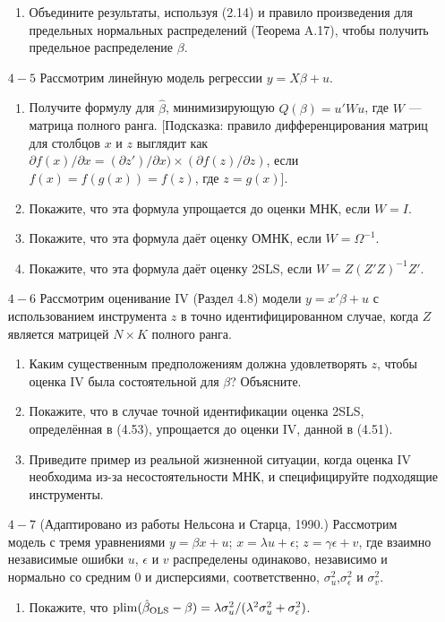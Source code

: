 \begin{small}
\begin{enumerate}
\begin{enumerate}
\item Объедините результаты, используя (2.14) и правило произведения для предельных нормальных распределений (Теорема A.17), чтобы получить предельное распределение $\beta$. 
\end{enumerate}
\item [$4-5$] Рассмотрим линейную модель регрессии $y = X\beta +u$.
\begin{enumerate}
\item Получите формулу для $\hat{\beta}$, минимизирующую $Q(\beta) = u'Wu$, где $W$ --- матрица полного ранга. [Подсказка:  правило дифференцирования матриц для столбцов $x$ и $z$ выглядит как $\partial f(x)/\partial x = (\partial z')/\partial x) \times (\partial f(z)/\partial z)$, если $f(x) = f(g(x)) = f(z)$, где $z = g(x)$].
\item Покажите, что эта формула упрощается до оценки МНК, если $W=I$.
\item Покажите, что эта формула даёт оценку ОМНК, если $W= \Omega^{-1}$.
\item Покажите, что эта формула даёт оценку 2SLS, если $W= Z(Z'Z)^{-1}Z'$.
\end{enumerate}
\item [$4-6$] Рассмотрим оценивание IV (Раздел 4.8) модели $y = x'\beta +u$ с использованием инструмента $z$ в точно идентифицированном случае, когда $Z$ является матрицей $N \times K$ полного ранга.
\begin{enumerate}
\item Каким существенным предположениям должна удовлетворять $z$, чтобы оценка IV была состоятельной для $\beta$? Объясните.
\item Покажите, что в случае точной идентификации оценка 2SLS, определённая в (4.53), упрощается до оценки IV, данной в (4.51).
\item Приведите пример из реальной жизненной ситуации, когда оценка IV необходима из-за несостоятельности МНК, и специфицируйте подходящие инструменты. 
\end{enumerate}
\item [$4-7$] (Адаптировано из работы Нельсона и Старца, 1990.) Рассмотрим модель с тремя уравнениями $y = \beta x +u$; $x = \lambda u + \epsilon$; $z = \gamma \epsilon + v$, где взаимно независимые ошибки $u$, $\epsilon$ и $v$ распределены одинаково, независимо и нормально со средним $0$ и дисперсиями, соответственно, $\sigma^2_{u}$,$\sigma^2_{\epsilon}$ и $\sigma^2_{v}$.
\begin{enumerate}
\item Покажите, что $\mathrm{plim } (\hat{\beta}_{\text{OLS}}-\beta) = \lambda \sigma^2_{u}/(\lambda^2 \sigma^2_{u} +\sigma^2_{\epsilon})$.

\end{enumerate}
\end{enumerate}
\end{small}
